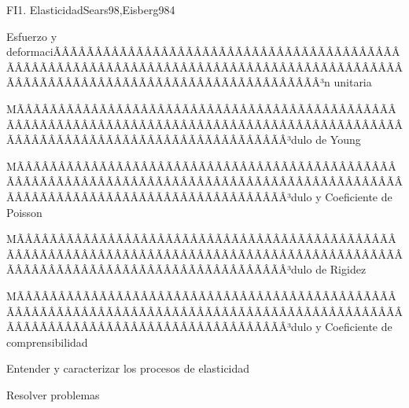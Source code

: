 \begin{sumilla}
\begin{outcomes}
\end{outcomes}

\begin{unit}{FI1. Elasticidad}{Sears98,Eisberg98}{4}
\begin{topicos}
         \item  Esfuerzo y deformaciÃÂÃÂÃÂÃÂÃÂÃÂÃÂÃÂÃÂÃÂÃÂÃÂÃÂÃÂÃÂÃÂÃÂÃÂÃÂÃÂÃÂÃÂÃÂÃÂÃÂÃÂÃÂÃÂÃÂÃÂÃÂÃÂÃÂÃÂÃÂÃÂÃÂÃÂÃÂÃÂÃÂÃÂÃÂÃÂÃÂÃÂÃÂÃÂÃÂÃÂÃÂÃÂÃÂÃÂÃÂÃÂÃÂÃÂÃÂÃÂÃÂÃÂÃÂÃÂ³n unitaria
	 \item  MÃÂÃÂÃÂÃÂÃÂÃÂÃÂÃÂÃÂÃÂÃÂÃÂÃÂÃÂÃÂÃÂÃÂÃÂÃÂÃÂÃÂÃÂÃÂÃÂÃÂÃÂÃÂÃÂÃÂÃÂÃÂÃÂÃÂÃÂÃÂÃÂÃÂÃÂÃÂÃÂÃÂÃÂÃÂÃÂÃÂÃÂÃÂÃÂÃÂÃÂÃÂÃÂÃÂÃÂÃÂÃÂÃÂÃÂÃÂÃÂÃÂÃÂÃÂÃÂ³dulo de Young
         \item  MÃÂÃÂÃÂÃÂÃÂÃÂÃÂÃÂÃÂÃÂÃÂÃÂÃÂÃÂÃÂÃÂÃÂÃÂÃÂÃÂÃÂÃÂÃÂÃÂÃÂÃÂÃÂÃÂÃÂÃÂÃÂÃÂÃÂÃÂÃÂÃÂÃÂÃÂÃÂÃÂÃÂÃÂÃÂÃÂÃÂÃÂÃÂÃÂÃÂÃÂÃÂÃÂÃÂÃÂÃÂÃÂÃÂÃÂÃÂÃÂÃÂÃÂÃÂÃÂ³dulo y Coeficiente de Poisson
	 \item  MÃÂÃÂÃÂÃÂÃÂÃÂÃÂÃÂÃÂÃÂÃÂÃÂÃÂÃÂÃÂÃÂÃÂÃÂÃÂÃÂÃÂÃÂÃÂÃÂÃÂÃÂÃÂÃÂÃÂÃÂÃÂÃÂÃÂÃÂÃÂÃÂÃÂÃÂÃÂÃÂÃÂÃÂÃÂÃÂÃÂÃÂÃÂÃÂÃÂÃÂÃÂÃÂÃÂÃÂÃÂÃÂÃÂÃÂÃÂÃÂÃÂÃÂÃÂÃÂ³dulo de Rigidez
         \item  MÃÂÃÂÃÂÃÂÃÂÃÂÃÂÃÂÃÂÃÂÃÂÃÂÃÂÃÂÃÂÃÂÃÂÃÂÃÂÃÂÃÂÃÂÃÂÃÂÃÂÃÂÃÂÃÂÃÂÃÂÃÂÃÂÃÂÃÂÃÂÃÂÃÂÃÂÃÂÃÂÃÂÃÂÃÂÃÂÃÂÃÂÃÂÃÂÃÂÃÂÃÂÃÂÃÂÃÂÃÂÃÂÃÂÃÂÃÂÃÂÃÂÃÂÃÂÃÂ³dulo y Coeficiente de comprensibilidad
   \end{topicos}

   \begin{objetivos}
         \item  Entender y caracterizar los procesos de elasticidad
         \item  Resolver problemas
   \end{objetivos}
\end{unit}


\end{sumilla}
